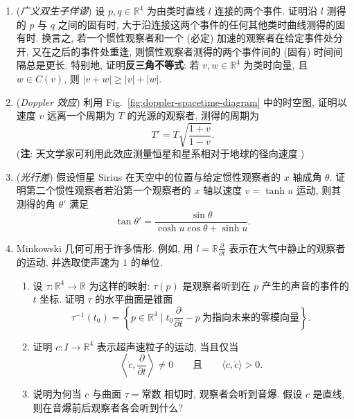 \begin{RiemannExercise}
\begin{enumerate}[label=(\arabic*),ref=\arabic*,leftmargin=*]
\begin{enumerate}[label=(\alph*),leftmargin=*]
\begin{enumerate}[label=(\roman*),leftmargin=*]
\item $\frac12|u|$ 是上述曲线的位置向量扫过的区域的面积;
\item 双曲角可相加;
\item Exercise~\ref{ex:special-relativity}(\ref{ex:relativistic-velocity-addition}) 的速度叠加公式就是双曲正切的和角公式.
\end{enumerate}
\end{enumerate}
\item\label{ex:generalized-twin-paradox-and-reverse-triangle}
(\emph{广义双生子佯谬}) 设 $p,q\in\mathbb{R}^4$ 为由类时直线 $l$ 连接的两个事件. 证明沿 $l$ 测得的 $p$ 与 $q$ 之间的固有时, 大于沿连接这两个事件的任何其他类时曲线测得的固有时. 换言之, 若一个惯性观察者和一个 (必定) 加速的观察者在给定事件处分开, 又在之后的事件处重逢, 则惯性观察者测得的两个事件间的 (固有) 时间间隔总是更长. 特别地, 证明\textbf{反三角不等式}: 若 $v,w\in\mathbb{R}^4$ 为类时向量, 且 $w\in C(v)$, 则 $|v+w|\geq|v|+|w|$.
\item\label{ex:relativistic-doppler-effect}
(\emph{Doppler 效应}) 利用 Fig.~\ref{fig:doppler-spacetime-diagram} 中的时空图, 证明以速度 $v$ 远离一个周期为 $T$ 的光源的观察者, 测得的周期为
\[
  T'=T\sqrt{\frac{1+v}{1-v}}.
\]
(\textbf{注}: 天文学家可利用此效应测量恒星和星系相对于地球的径向速度.)
\item\label{ex:relativistic-stellar-aberration}
(\emph{光行差}) 假设恒星 Sirius 在天空中的位置与给定惯性观察者的 $x$ 轴成角 $\theta$. 证明第二个惯性观察者若沿第一个观察者的 $x$ 轴以速度 $v=\tanh u$ 运动, 则其测得的角 $\theta'$ 满足
\[
  \tan\theta'=\frac{\sin\theta}{\cosh u\cos\theta+\sinh u}.
\]
\item\label{ex:sound-cones-and-sonic-boom}
Minkowski 几何可用于许多情形. 例如, 用 $l=\mathbb{R}\frac{\partial}{\partial t}$ 表示在大气中静止的观察者的运动, 并选取使声速为 $1$ 的单位.
\begin{enumerate}[label=(\alph*),leftmargin=*]
\item 设 $\tau:\mathbb{R}^4\to\mathbb{R}$ 为这样的映射: $\tau(p)$ 是观察者听到在 $p$ 产生的声音的事件的 $t$ 坐标. 证明 $\tau$ 的水平曲面是锥面
\[
  \tau^{-1}(t_0)=\left\{p\in\mathbb{R}^4\mid
    t_0\frac{\partial}{\partial t}-p\ \text{为指向未来的零模向量}\right\}.
\]
\item 证明 $c:I\to\mathbb{R}^4$ 表示超声速粒子的运动, 当且仅当
\[
  \left\langle\dot c,\frac{\partial}{\partial t}\right\rangle\ne0
  \qquad\text{且}\qquad\langle\dot c,\dot c\rangle>0.
\]
\item 说明为何当 $c$ 与曲面 $\tau=\text{常数}$ 相切时, 观察者会听到音爆. 假设 $c$ 是直线, 则在音爆前后观察者各会听到什么?

\end{enumerate}
\end{enumerate}
\end{RiemannExercise}
